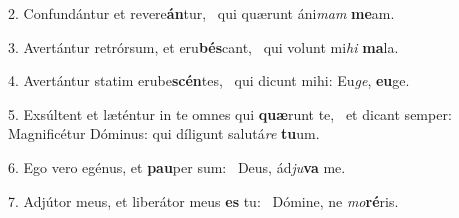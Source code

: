 2. Confundántur et revere\textbf{án}tur, \ast\  qui quærunt áni\textit{mam} \textbf{me}am.\

3. Avertántur retrórsum, et eru\textbf{bés}cant, \ast\  qui volunt mi\textit{hi} \textbf{ma}la.\

4. Avertántur statim erube\textbf{scén}tes, \ast\  qui dicunt mihi: Eu\textit{ge}, \textbf{eu}ge.\

5. Exsúltent et læténtur in te omnes qui \textbf{quæ}runt te, \ast\  et dicant semper: Magnificétur Dóminus: qui díligunt salutá\textit{re} \textbf{tu}um.\

6. Ego vero egénus, et \textbf{pau}per sum: \ast\  Deus, ád\textit{ju}\textbf{va} me.\

7. Adjútor meus, et liberátor meus \textbf{es} tu: \ast\  Dómine, ne \textit{mo}\textbf{ré}ris.\

